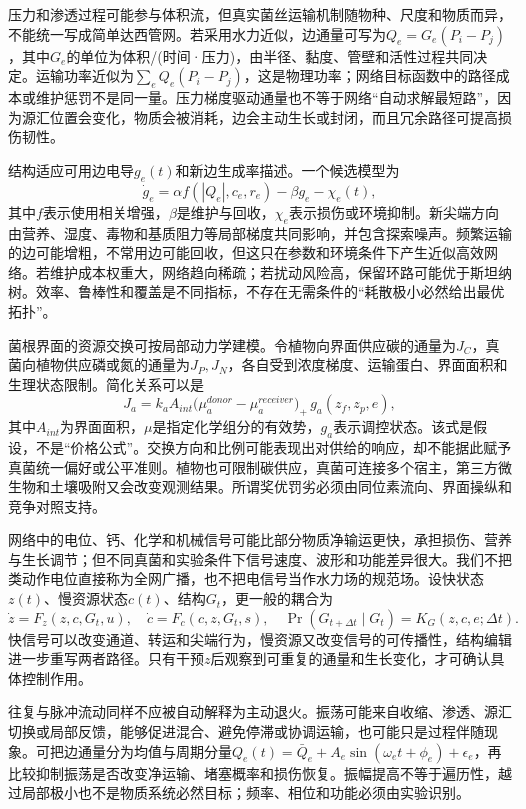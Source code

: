 压力和渗透过程可能参与体积流，但真实菌丝运输机制随物种、尺度和物质而异，不能统一写成简单达西管网。若采用水力近似，边通量可写为$Q_e=G_e(P_i-P_j)$，其中$G_e$的单位为体积/(时间·压力)，由半径、黏度、管壁和活性过程共同决定。运输功率近似为$\sum_e Q_e(P_i-P_j)$，这是物理功率；网络目标函数中的路径成本或维护惩罚不是同一量。压力梯度驱动通量也不等于网络“自动求解最短路”，因为源汇位置会变化，物质会被消耗，边会主动生长或封闭，而且冗余路径可提高损伤韧性。

结构适应可用边电导$g_e(t)$和新边生成率描述。一个候选模型为
\begin{equation}
 \dot g_e=\alpha f(|Q_e|,c_e,r_e)-\beta g_e-\chi_e(t),
\end{equation}
其中$f$表示使用相关增强，$\beta$是维护与回收，$\chi_e$表示损伤或环境抑制。新尖端方向由营养、湿度、毒物和基质阻力等局部梯度共同影响，并包含探索噪声。频繁运输的边可能增粗，不常用边可能回收，但这只在参数和环境条件下产生近似高效网络。若维护成本权重大，网络趋向稀疏；若扰动风险高，保留环路可能优于斯坦纳树。效率、鲁棒性和覆盖是不同指标，不存在无需条件的“耗散极小必然给出最优拓扑”。

菌根界面的资源交换可按局部动力学建模。令植物向界面供应碳的通量为$J_C$，真菌向植物供应磷或氮的通量为$J_P,J_N$，各自受到浓度梯度、运输蛋白、界面面积和生理状态限制。简化关系可以是
\begin{equation}
 J_a=k_aA_{int}\bigl(\mu_a^{donor}-\mu_a^{receiver}\bigr)_+\,g_a(z_f,z_p,e),
\end{equation}
其中$A_{int}$为界面面积，$\mu$是指定化学组分的有效势，$g_a$表示调控状态。该式是假设，不是“价格公式”。交换方向和比例可能表现出对供给的响应，却不能据此赋予真菌统一偏好或公平准则。植物也可限制碳供应，真菌可连接多个宿主，第三方微生物和土壤吸附又会改变观测结果。所谓奖优罚劣必须由同位素流向、界面操纵和竞争对照支持。

网络中的电位、钙、化学和机械信号可能比部分物质净输运更快，承担损伤、营养与生长调节；但不同真菌和实验条件下信号速度、波形和功能差异很大。我们不把类动作电位直接称为全网广播，也不把电信号当作水力场的规范场。设快状态$z(t)$、慢资源状态$c(t)$、结构$G_t$，更一般的耦合为
\begin{equation}
 \dot z=F_z(z,c,G_t,u),\quad \dot c=F_c(c,z,G_t,s),\quad
 \Pr(G_{t+\Delta t}\mid G_t)=K_G(z,c,e;\Delta t).
\end{equation}
快信号可以改变通道、转运和尖端行为，慢资源又改变信号的可传播性，结构编辑进一步重写两者路径。只有干预$z$后观察到可重复的通量和生长变化，才可确认具体控制作用。

往复与脉冲流动同样不应被自动解释为主动退火。振荡可能来自收缩、渗透、源汇切换或局部反馈，能够促进混合、避免停滞或协调运输，也可能只是过程伴随现象。可把边通量分为均值与周期分量$Q_e(t)=\bar Q_e+A_e\sin(\omega_et+\phi_e)+\epsilon_e$，再比较抑制振荡是否改变净运输、堵塞概率和损伤恢复。振幅提高不等于遍历性，越过局部极小也不是物质系统必然目标；频率、相位和功能必须由实验识别。

